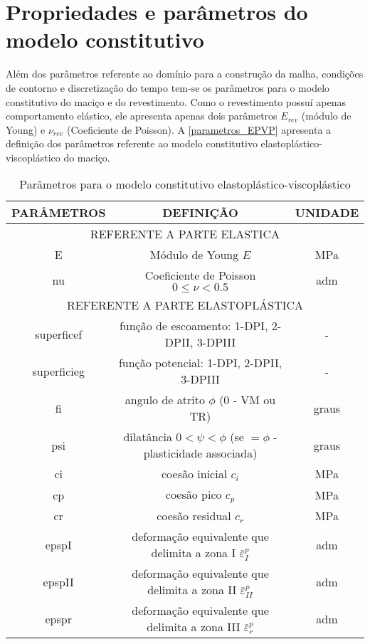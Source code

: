 \section{Propriedades e parâmetros do modelo constitutivo}
Além dos parâmetros referente ao domínio para a construção da malha, condições de contorno e discretização do tempo tem-se os parâmetros para o modelo constitutivo do maciço e do revestimento. Como o revestimento possuí apenas comportamento elástico, ele apresenta apenas dois parâmetros $E_{rev}$ (módulo de Young) e $\nu_{rev}$ (Coeficiente de Poisson). A \autoref{parametros_EPVP} apresenta a definição dos parâmetros referente ao modelo constitutivo elastoplástico-viscoplástico do maciço.
\begin{table}[H]
	\caption{Parâmetros para o modelo constitutivo elastoplástico-viscoplástico}
	\label{parametros_EPVP}
	\centering
	\small
	\renewcommand{\arraystretch}{1.25}
	\begin{tabular}{c c c}
		\hline
		\multicolumn{1}{c}{\textbf{PARÂMETROS}} &
		\multicolumn{1}{c}{\textbf{DEFINIÇÃO}} &
		\multicolumn{1}{c}{\textbf{UNIDADE}} \\
		\hline
		\multicolumn{3}{c}{REFERENTE A PARTE ELASTICA} \\
		\hline
		E & Módulo de Young $E$  & MPa \\			
		nu & Coeficiente de Poisson $0 \leq \nu<0.5$  & adm \\		
		\hline
		\multicolumn{3}{c}{REFERENTE A PARTE ELASTOPLÁSTICA} \\
		\hline
		superficef & função de escoamento: 1-DPI, 2-DPII, 3-DPIII  & - \\		
		superficieg & função potencial: 1-DPI, 2-DPII, 3-DPIII & - \\
		fi & angulo de atrito $\phi$ (0 - VM ou TR) & graus \\		
		psi & dilatância $0<\psi<\phi$ (se $=\phi$ - plasticidade associada) & graus \\	
		ci & coesão inicial $c_i$ & MPa \\
		cp & coesão pico $c_p$ & MPa \\
		cr & coesão residual $c_r$ & MPa \\ 
		epspI & deformação equivalente que delimita a zona I $\bar \varepsilon^p_{I}$ & adm \\
		epspII & deformação equivalente que delimita a zona II $\bar \varepsilon^p_{II}$ & adm \\
		epspr & deformação equivalente que delimita a zona III $\bar \varepsilon^p_{r}$ & adm \\	

\end{tabular}
\end{table}
